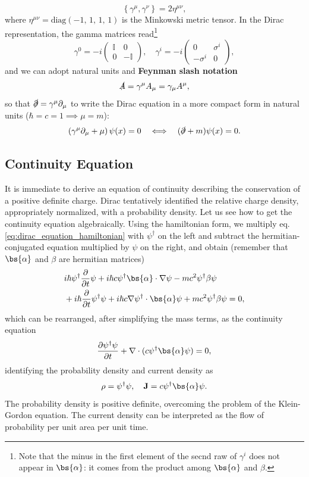 \[
    \left\{ \gamma^\mu, \gamma^\nu \right\} = 2 \eta^{\mu \nu},
\]
where \(\eta^{\mu \nu} = \text{diag}(-1,\,1,\,1,\,1)\) is the Minkowski metric tensor. In the Dirac representation, the gamma matrices read\footnote{Note that the minus in the first element of the secnd raw of \(\gamma^i\) does not appear in \(\bs{\alpha}\): it comes from the product among \(\bs{\alpha}\) and \(\beta\).}
\[
    \gamma^0 = -i \begin{pmatrix}
        \mathbb{I} & 0           \\
        0          & -\mathbb{I}
    \end{pmatrix}, \quad \gamma^i = -i \begin{pmatrix}
        0         & \sigma^i \\
        -\sigma^i & 0
    \end{pmatrix},
\]
and we can adopt natural units and \textbf{Feynman slash notation}
\[
    \slashed{A} = \gamma^{\mu} A_{\mu} = \gamma_{\mu} A^{\mu},
\]
so that \(\slashed{\partial} = \gamma^{\mu} \partial_{\mu}\) to write the Dirac equation in a more compact form in natural units (\(\hbar = c = 1 \implies \mu=m\)):
\[
    \left(\gamma^{\mu} \partial_{\mu} + \mu \right) \psi(x) = 0 \quad \Longleftrightarrow \quad (\slashed{\partial} + m) \psi(x) = 0.
\]

\subsection{Continuity Equation}

It is immediate to derive an equation of continuity describing the conservation of a positive definite charge. Dirac tentatively identified the relative charge density, appropriately normalized, with a probability density. Let us see how to get the continuity equation algebraically. Using the hamiltonian form, we multiply eq. \eqref{eq:dirac_equation_hamiltonian} with \(\psi^\dagger\) on the left and subtract the hermitian-conjugated equation multiplied by \(\psi\) on the right, and obtain (remember that \(\bs{\alpha}\) and \(\beta\) are hermitian matrices)
\[
    \begin{aligned}
         & i \hbar \psi^{\dagger} \frac{\partial}{\partial t} \psi + i \hbar c \psi^{\dagger} \bs{\alpha} \cdot \nabla \psi - m c^2 \psi^{\dagger} \beta \psi        \\
         & + i \hbar \frac{\partial}{\partial t} \psi^{\dagger} \psi + i \hbar c \nabla \psi^{\dagger} \cdot \bs{\alpha} \psi + m c^2 \psi^{\dagger} \beta \psi = 0,
    \end{aligned}
\]
which can be rearranged, after simplifying the mass terms, as the continuity equation
\begin{equation}
    \frac{\partial \psi^{\dagger} \psi}{\partial t} + \nabla \cdot (c \psi^{\dagger} \bs{\alpha} \psi) = 0,
    \label{eq:dirac_continuity_equation}
\end{equation}
identifying the probability density and current density as
\[
    \rho = \psi^{\dagger} \psi, \quad \mathbf{J} = c \psi^{\dagger} \bs{\alpha} \psi.
\]
The probability density is positive definite, overcoming the problem of the Klein-Gordon equation. The current density can be interpreted as the flow of probability per unit area per unit time.

